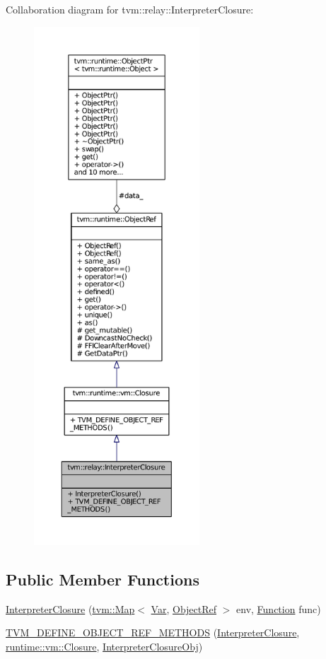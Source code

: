 Collaboration diagram for tvm\+:\+:relay\+:\+:Interpreter\+Closure\+:
\nopagebreak
\begin{figure}[H]
\begin{center}
\leavevmode
\includegraphics[height=550pt]{classtvm_1_1relay_1_1InterpreterClosure__coll__graph}
\end{center}
\end{figure}
\subsection*{Public Member Functions}
\begin{DoxyCompactItemize}
\item 
\hyperlink{classtvm_1_1relay_1_1InterpreterClosure_a7ed5dfc275aef34ebe2d024f2652265a}{Interpreter\+Closure} (\hyperlink{classtvm_1_1Map}{tvm\+::\+Map}$<$ \hyperlink{classtvm_1_1relay_1_1Var}{Var}, \hyperlink{classtvm_1_1runtime_1_1ObjectRef_aa07c1f6d66a438ea950637d13ed09471}{Object\+Ref} $>$ env, \hyperlink{classtvm_1_1relay_1_1Function}{Function} func)
\item 
\hyperlink{classtvm_1_1relay_1_1InterpreterClosure_a586ccb5dffd732dc7b0978f287b8946c}{T\+V\+M\+\_\+\+D\+E\+F\+I\+N\+E\+\_\+\+O\+B\+J\+E\+C\+T\+\_\+\+R\+E\+F\+\_\+\+M\+E\+T\+H\+O\+DS} (\hyperlink{classtvm_1_1relay_1_1InterpreterClosure}{Interpreter\+Closure}, \hyperlink{classtvm_1_1runtime_1_1vm_1_1Closure}{runtime\+::vm\+::\+Closure}, \hyperlink{classtvm_1_1relay_1_1InterpreterClosureObj}{Interpreter\+Closure\+Obj})
\end{DoxyCompactItemize}
